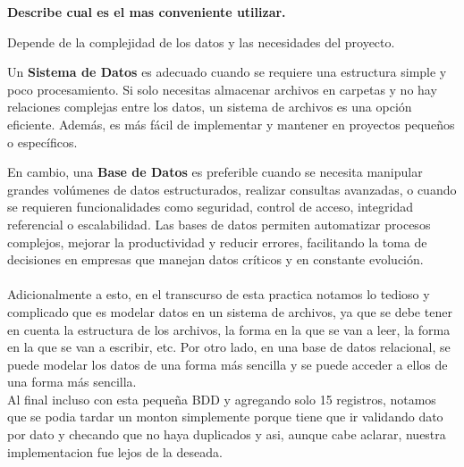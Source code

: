 \begin{center}
    \textbf{Describe cual es el mas conveniente utilizar.}
    \vspace{.5cm}
\end{center}

Depende de la complejidad de los datos y las necesidades del proyecto.

Un \textbf{Sistema de Datos} es adecuado cuando se requiere una estructura simple y poco procesamiento. Si solo necesitas almacenar archivos en carpetas y no hay relaciones complejas entre los datos, un sistema de archivos es una opción eficiente. Además, es más fácil de implementar y mantener en proyectos pequeños o específicos.

En cambio, una \textbf{Base de Datos} es preferible cuando se necesita manipular grandes volúmenes de datos estructurados, realizar consultas avanzadas, o cuando se requieren funcionalidades como seguridad, control de acceso, integridad referencial o escalabilidad. Las bases de datos permiten automatizar procesos complejos, mejorar la productividad y reducir errores, facilitando la toma de decisiones en empresas que manejan datos críticos y en constante evolución.\\

\cite{sooluciona}\\

Adicionalmente a esto, en el transcurso de esta practica notamos lo tedioso y complicado que es 
modelar datos en un sistema de archivos, ya que se debe tener en cuenta la estructura de los archivos,
la forma en la que se van a leer, la forma en la que se van a escribir, etc. Por otro lado, en una base de datos
relacional, se puede modelar los datos de una forma más sencilla y se puede acceder a ellos de una forma más sencilla.\\ 
Al final incluso con esta pequeña BDD y agregando solo 15 registros, notamos que se podia tardar un monton simplemente
porque tiene que ir validando dato por dato y checando que no haya duplicados y asi, aunque cabe aclarar, nuestra implementacion
fue lejos de la deseada.\\
\vspace{.5cm}
